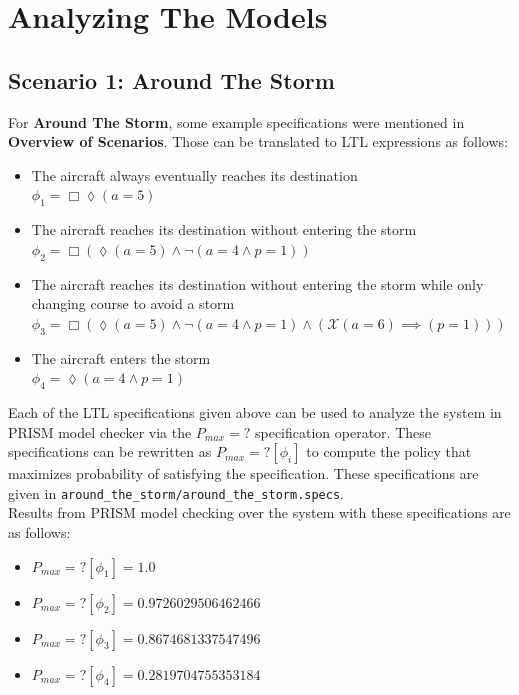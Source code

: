 \documentclass{article}
\begin{document}
\section{Analyzing The Models}
\subsection*{Scenario 1: Around The Storm}

For \textbf{Around The Storm}, some example specifications were mentioned in \textbf{Overview of Scenarios}. Those can be translated to LTL expressions as follows:
\begin{itemize}
    \item The aircraft always eventually reaches its destination \\
    $\phi_1=\Box\lozenge (a=5)$
    \item The aircraft reaches its destination without entering the storm \\
    $\phi_2=\Box(\lozenge (a=5) \land \lnot(a=4 \land p=1))$
    \item The aircraft reaches its destination without entering the storm while only changing course to avoid a storm \\
    $\phi_3 = \Box(\lozenge (a=5) \land \lnot(a=4 \land p=1) \land (\mathcal{X} (a=6) \implies (p=1)))$
    \item The aircraft enters the storm \\
    $\phi_4 = \lozenge(a=4\land p=1)$
\end{itemize}

Each of the LTL specifications given above can be used to analyze the system in PRISM model checker via the $P_{max}=?$ specification operator. These specifications can be rewritten as $P_{max}=?[\phi_i]$ to compute the policy that maximizes probability of satisfying the specification. These specifications are given in \texttt{around\_the\_storm/around\_the\_storm.specs}.\\

Results from PRISM model checking over the system with these specifications are as follows:
\begin{itemize}
    \item $P_{max}=?[\phi_1]=1.0$
    \item $P_{max}=?[\phi_2]=0.9726029506462466$
    \item $P_{max}=?[\phi_3]=0.8674681337547496$
    \item $P_{max}=?[\phi_4]=0.2819704755353184$
\end{itemize}
\end{document}
